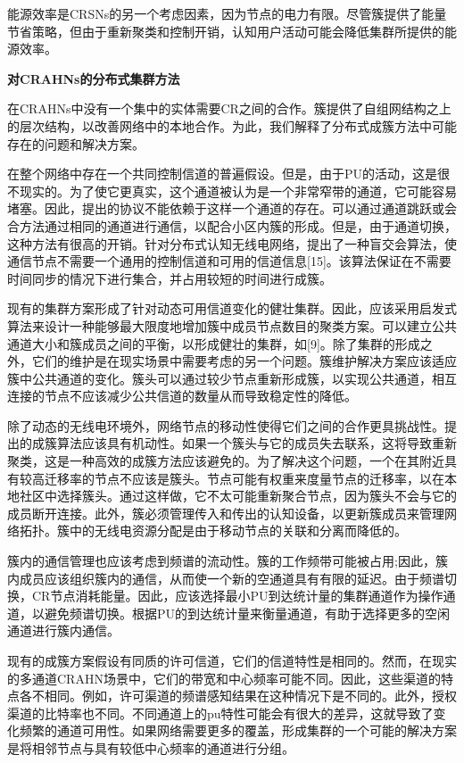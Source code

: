 \documentclass[a4paper,AutoFakeBold,oneside,12pt]{book}
\begin{document}
  能源效率是CRSNs的另一个考虑因素，因为节点的电力有限。尽管簇提供了能量节省策略，但由于重新聚类和控制开销，认知用户活动可能会降低集群所提供的能源效率。

\begin{center}
\textbf{对CRAHNs的分布式集群方法}
\end{center}

  在CRAHNs中没有一个集中的实体需要CR之间的合作。簇提供了自组网结构之上的层次结构，以改善网络中的本地合作。为此，我们解释了分布式成簇方法中可能存在的问题和解决方案。

  在整个网络中存在一个共同控制信道的普遍假设。但是，由于PU的活动，这是很不现实的。为了使它更真实，这个通道被认为是一个非常窄带的通道，它可能容易堵塞。因此，提出的协议不能依赖于这样一个通道的存在。可以通过通道跳跃或会合方法通过相同的通道进行通信，以配合小区内簇的形成。但是，由于通道切换，这种方法有很高的开销。针对分布式认知无线电网络，提出了一种盲交会算法，使通信节点不需要一个通用的控制信道和可用的信道信息[15]。该算法保证在不需要时间同步的情况下进行集合，并占用较短的时间进行成簇。

  现有的集群方案形成了针对动态可用信道变化的健壮集群。因此，应该采用启发式算法来设计一种能够最大限度地增加簇中成员节点数目的聚类方案。可以建立公共通道大小和簇成员之间的平衡，以形成健壮的集群，如[9]。除了集群的形成之外，它们的维护是在现实场景中需要考虑的另一个问题。簇维护解决方案应该适应簇中公共通道的变化。簇头可以通过较少节点重新形成簇，以实现公共通道，相互连接的节点不应该减少公共信道的数量从而导致稳定性的降低。

  除了动态的无线电环境外，网络节点的移动性使得它们之间的合作更具挑战性。提出的成簇算法应该具有机动性。如果一个簇头与它的成员失去联系，这将导致重新聚类，这是一种高效的成簇方法应该避免的。为了解决这个问题，一个在其附近具有较高迁移率的节点不应该是簇头。节点可能有权重来度量节点的迁移率，以在本地社区中选择簇头。通过这样做，它不太可能重新聚合节点，因为簇头不会与它的成员断开连接。此外，簇必须管理传入和传出的认知设备，以更新簇成员来管理网络拓扑。簇中的无线电资源分配是由于移动节点的关联和分离而降低的。

  簇内的通信管理也应该考虑到频谱的流动性。簇的工作频带可能被占用;因此，簇内成员应该组织簇内的通信，从而使一个新的空通道具有有限的延迟。由于频谱切换，CR节点消耗能量。因此，应该选择最小PU到达统计量的集群通道作为操作通道，以避免频谱切换。根据PU的到达统计量来衡量通道，有助于选择更多的空闲通道进行簇内通信。

  现有的成簇方案假设有同质的许可信道，它们的信道特性是相同的。然而，在现实的多通道CRAHN场景中，它们的带宽和中心频率可能不同。因此，这些渠道的特点各不相同。例如，许可渠道的频谱感知结果在这种情况下是不同的。此外，授权渠道的比特率也不同。不同通道上的pu特性可能会有很大的差异，这就导致了变化频繁的通道可用性。如果网络需要更多的覆盖，形成集群的一个可能的解决方案是将相邻节点与具有较低中心频率的通道进行分组。
\thispagestyle{empty}
\begin{center}


\end{center}

 


 
\end{document}
